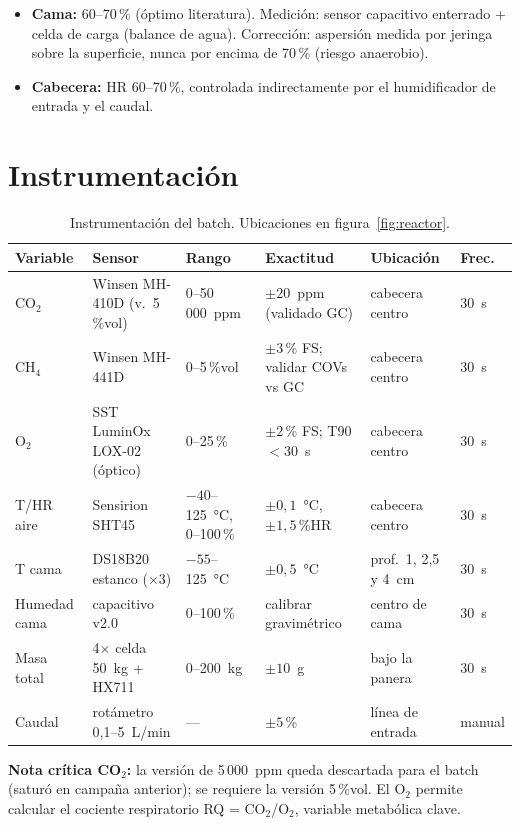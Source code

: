 \documentclass[11pt,a4paper]{article}
\begin{document}
\begin{itemize}
  \item \textbf{Cama:} 60--70\,\% (óptimo literatura). Medición:
        sensor capacitivo enterrado + celda de carga (balance de agua).
        Corrección: aspersión medida por jeringa sobre la superficie,
        nunca por encima de 70\,\% (riesgo anaerobio).
  \item \textbf{Cabecera:} HR 60--70\,\%, controlada indirectamente
        por el humidificador de entrada y el caudal.
\end{itemize}

\section{Instrumentación}
\label{sec:instrumentacion}

\begin{table}[h]
\centering\small
\caption{Instrumentación del batch. Ubicaciones en
figura~\ref{fig:reactor}.}
\begin{tabular}{@{}llllll@{}}
\toprule
Variable & Sensor & Rango & Exactitud & Ubicación & Frec. \\
\midrule
CO$_2$ & Winsen MH-410D (v.~5\,\%vol) & 0--50\,000~ppm & $\pm20$~ppm (validado GC) & cabecera centro & 30~s \\
CH$_4$ & Winsen MH-441D & 0--5\,\%vol & $\pm3$\,\% FS; validar COVs vs GC & cabecera centro & 30~s \\
O$_2$  & SST LuminOx LOX-02 (óptico) & 0--25\,\% & $\pm2$\,\% FS; T90$<$30~s & cabecera centro & 30~s \\
T/HR aire & Sensirion SHT45 & $-40$--125~°C, 0--100\,\% & $\pm0{,}1$~°C, $\pm1{,}5$\,\%HR & cabecera centro & 30~s \\
T cama & DS18B20 estanco ($\times3$) & $-55$--125~°C & $\pm0{,}5$~°C & prof.\ 1, 2{,}5 y 4~cm & 30~s \\
Humedad cama & capacitivo v2.0 & 0--100\,\% & calibrar gravimétrico & centro de cama & 30~s \\
Masa total & 4$\times$ celda 50~kg + HX711 & 0--200~kg & $\pm10$~g & bajo la panera & 30~s \\
Caudal & rotámetro 0{,}1--5~L/min & --- & $\pm5$\,\% & línea de entrada & manual \\
\bottomrule
\end{tabular}
\end{table}

\textbf{Nota crítica CO$_2$:} la versión de 5\,000~ppm queda
descartada para el batch (saturó en campaña anterior); se requiere
la versión 5\,\%vol. El O$_2$ permite calcular el cociente
respiratorio RQ = CO$_2$/O$_2$, variable metabólica clave.
\end{document}
